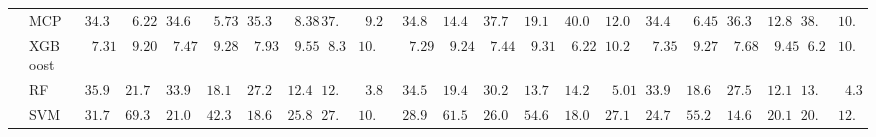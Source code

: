 \begin{tabular}{ll|ll|llllll|llllll|llllll}
 & MCP  & $\phantom{0}34.36$ & $\phantom{00}6.22$ & $\phantom{0}34.62$ & $\phantom{00}5.73$ & $\phantom{0}35.30$ & $\phantom{00}8.38$ & $37.89$ & $\phantom{0}9.25$ & $\phantom{0}34.89$ & $\phantom{0}14.44$ & $\phantom{0}37.79$ & $\phantom{0}19.13$ & $\phantom{0}40.09$ & $\phantom{0}12.09$ & $\phantom{0}34.44$ & $\phantom{00}6.45$ & $\phantom{0}36.34$ & $\phantom{0}12.84$ & $38.61$ & $10.46$ \\
 & XGBoost  & $\phantom{00}7.31$ & $\phantom{00}9.20$ & $\phantom{00}7.47$ & $\phantom{00}9.28$ & $\phantom{00}7.93$ & $\phantom{00}9.55$ & $\phantom{0}8.31$ & $10.94$ & $\phantom{00}7.29$ & $\phantom{00}9.24$ & $\phantom{00}7.44$ & $\phantom{00}9.31$ & $\phantom{00}6.22$ & $\phantom{0}10.27$ & $\phantom{00}7.35$ & $\phantom{00}9.27$ & $\phantom{00}7.68$ & $\phantom{00}9.45$ & $\phantom{0}6.21$ & $10.32$ \\
 & RF  & $\phantom{0}35.98$ & $\phantom{0}21.75$ & $\phantom{0}33.96$ & $\phantom{0}18.16$ & $\phantom{0}27.21$ & $\phantom{0}12.43$ & $12.73$ & $\phantom{0}3.83$ & $\phantom{0}34.56$ & $\phantom{0}19.41$ & $\phantom{0}30.28$ & $\phantom{0}13.70$ & $\phantom{0}14.24$ & $\phantom{00}5.01$ & $\phantom{0}33.99$ & $\phantom{0}18.69$ & $\phantom{0}27.51$ & $\phantom{0}12.17$ & $13.53$ & $\phantom{0}4.31$ \\
 & SVM  & $\phantom{0}31.70$ & $\phantom{0}69.31$ & $\phantom{0}21.06$ & $\phantom{0}42.36$ & $\phantom{0}18.66$ & $\phantom{0}25.86$ & $27.20$ & $10.69$ & $\phantom{0}28.98$ & $\phantom{0}61.59$ & $\phantom{0}26.08$ & $\phantom{0}54.60$ & $\phantom{0}18.09$ & $\phantom{0}27.13$ & $\phantom{0}24.74$ & $\phantom{0}55.21$ & $\phantom{0}14.65$ & $\phantom{0}20.11$ & $20.13$ & $12.69$ \\
\hline 
\end{tabular}

